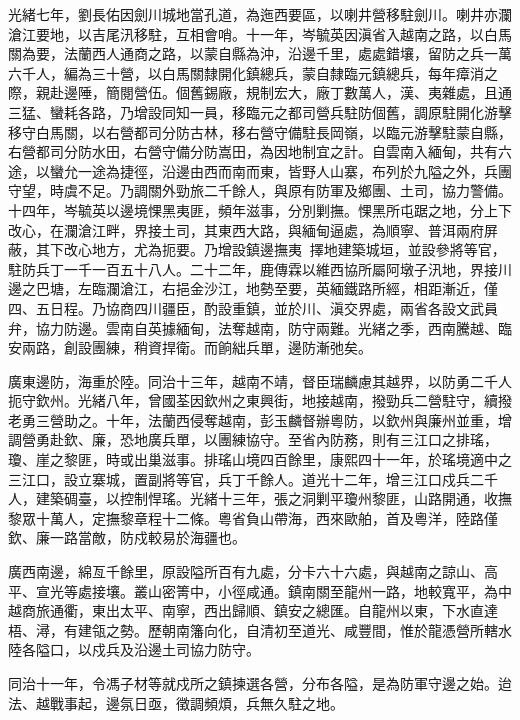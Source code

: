 \begin{pinyinscope}
光緒七年，劉長佑因劍川城地當孔道，為迤西要區，以喇井營移駐劍川。喇井亦瀾滄江要地，以吉尾汛移駐，互相會哨。十一年，岑毓英因滇省入越南之路，以白馬關為要，法蘭西人通商之路，以蒙自縣為沖，沿邊千里，處處錯壤，留防之兵一萬六千人，編為三十營，以白馬關隸開化鎮總兵，蒙自隸臨元鎮總兵，每年瘴消之際，親赴邊陲，簡閱營伍。個舊錫廠，規制宏大，廠丁數萬人，漢、夷雜處，且通三猛、蠻耗各路，乃增設同知一員，移臨元之都司營兵駐防個舊，調原駐開化游擊移守白馬關，以右營都司分防古林，移右營守備駐長岡嶺，以臨元游擊駐蒙自縣，右營都司分防水田，右營守備分防嵩田，為因地制宜之計。自雲南入緬甸，共有六途，以蠻允一途為捷徑，沿邊由西而南而東，皆野人山寨，布列於九隘之外，兵團守望，時虞不足。乃調關外勁旅二千餘人，與原有防軍及鄉團、土司，協力警備。十四年，岑毓英以邊境惈黑夷匪，頻年滋事，分別剿撫。惈黑所屯踞之地，分上下改心，在瀾滄江畔，界接土司，其東西大路，與緬甸逼處，為順寧、普洱兩府屏蔽，其下改心地方，尤為扼要。乃增設鎮邊撫夷，擇地建築城垣，並設參將等官，駐防兵丁一千一百五十八人。二十二年，鹿傳霖以維西協所屬阿墩子汛地，界接川邊之巴塘，左臨瀾滄江，右挹金沙江，地勢至要，英緬鐵路所經，相距漸近，僅四、五日程。乃協商四川疆臣，酌設重鎮，並於川、滇交界處，兩省各設文武員弁，協力防邊。雲南自英據緬甸，法奪越南，防守兩難。光緒之季，西南騰越、臨安兩路，創設團練，稍資捍衛。而餉絀兵單，邊防漸弛矣。

廣東邊防，海重於陸。同治十三年，越南不靖，督臣瑞麟慮其越界，以防勇二千人扼守欽州。光緒八年，曾國荃因欽州之東興街，地接越南，撥勁兵二營駐守，續撥老勇三營助之。十年，法蘭西侵奪越南，彭玉麟督辦粵防，以欽州與廉州並重，增調營勇赴欽、廉，恐地廣兵單，以團練協守。至省內防務，則有三江口之排瑤，瓊、崖之黎匪，時或出巢滋事。排瑤山境四百餘里，康熙四十一年，於瑤境適中之三江口，設立寨城，置副將等官，兵丁千餘人。道光十二年，增三江口戍兵二千人，建築碉臺，以控制悍瑤。光緒十三年，張之洞剿平瓊州黎匪，山路開通，收撫黎眾十萬人，定撫黎章程十二條。粵省負山帶海，西來歐舶，首及粵洋，陸路僅欽、廉一路當敵，防戍較易於海疆也。

廣西南邊，綿亙千餘里，原設隘所百有九處，分卡六十六處，與越南之諒山、高平、宣光等處接壤。叢山密箐中，小徑咸通。鎮南關至龍州一路，地較寬平，為中越商旅通衢，東出太平、南寧，西出歸順、鎮安之總匯。自龍州以東，下水直達梧、潯，有建瓴之勢。歷朝南籓向化，自清初至道光、咸豐間，惟於龍憑營所轄水陸各隘口，以戍兵及沿邊土司協力防守。

同治十一年，令馮子材等就戍所之鎮揀選各營，分布各隘，是為防軍守邊之始。迨法、越戰事起，邊氛日亟，徵調頻煩，兵無久駐之地。


\end{pinyinscope}
